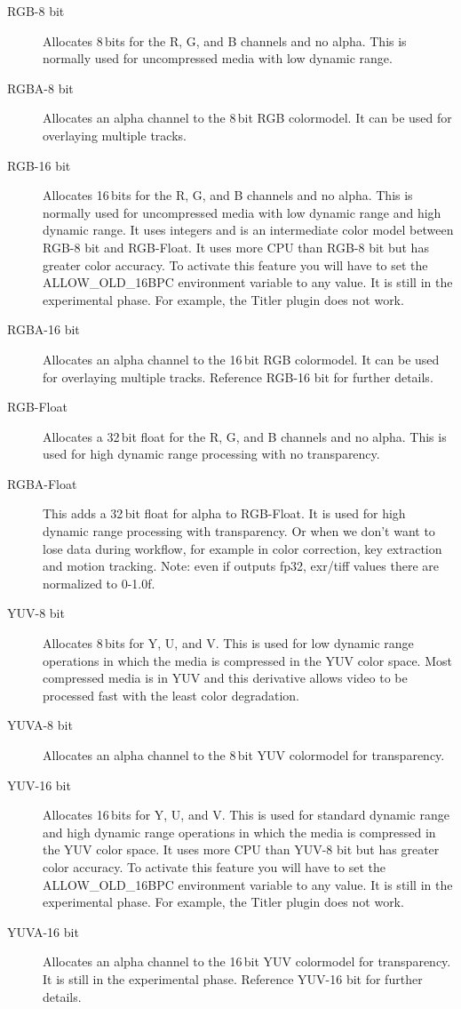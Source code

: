 \begin{description}
  \begin{description}
  \item[RGB-8 bit] Allocates 8\,bits for the R, G, and B channels
and no alpha. This is normally used for uncompressed media with low
dynamic range.
  \item[RGBA-8 bit] Allocates an alpha channel to the 8\,bit RGB
colormodel. It can be used for overlaying multiple tracks.
  \item[RGB-16 bit] Allocates 16\,bits for the R, G, and B channels and no alpha. This is normally used for uncompressed media with low dynamic range and high dynamic range. It uses integers and is an intermediate color model between RGB-8 bit and RGB-Float. It uses more CPU than RGB-8 bit but has greater color accuracy. To activate this feature you will have to set the ALLOW\_OLD\_16BPC environment variable to any value. It is still in the experimental phase. For example, the Titler plugin does not work.
  \item[RGBA-16 bit] Allocates an alpha channel to the 16\,bit RGB colormodel. It can be used for overlaying multiple tracks.
  Reference RGB-16 bit for further details.
  \item[RGB-Float] Allocates a 32\,bit float for the R, G, and B
channels and no alpha. This is used for high dynamic range
processing with no transparency.
  \item[RGBA-Float] This adds a 32\,bit float for alpha to
RGB-Float. It is used for high dynamic range processing with
transparency. Or when we don't want to lose data during workflow,
for example in color correction, key extraction and motion
tracking. Note: even if \CGG{} outputs fp32, exr/tiff values there are normalized to 0-1.0f.
  \item[YUV-8 bit] Allocates 8\,bits for Y, U, and V. This is used
for low dynamic range operations in which the media is compressed in
the YUV color space. Most compressed media is in YUV and this
derivative allows video to be processed fast with the least color
degradation.
  \item[YUVA-8 bit] Allocates an alpha channel to the 8\,bit YUV
colormodel for transparency.
  \item[YUV-16 bit] Allocates 16\,bits for Y, U, and V. This is used for standard dynamic range and high dynamic range operations in which the media is compressed in the YUV color space. It uses more CPU than YUV-8 bit but has greater color accuracy. To activate this feature you will have to set the ALLOW\_OLD\_16BPC environment variable to any value. It is still in the experimental phase. For example, the Titler plugin does not work.
  \item[YUVA-16 bit] Allocates an alpha channel to the 16\,bit YUV colormodel for transparency. It is still in the experimental phase. Reference YUV-16 bit for further details.
  \end{description}


\end{description}
